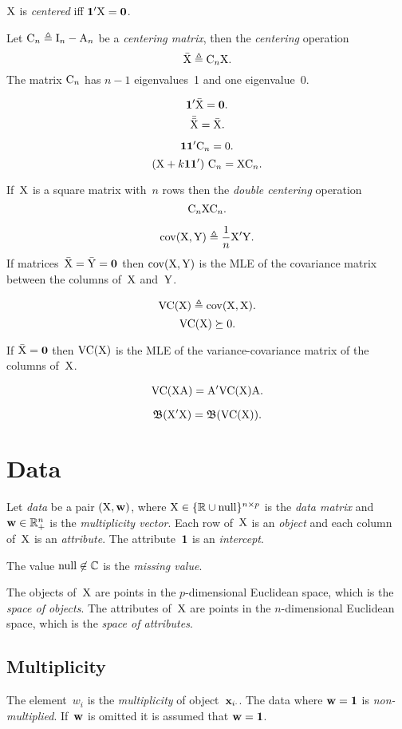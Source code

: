 \documentclass[10pt,a4paper]{article}
\theoremstyle{plain} \newtheorem{Lem}{Lemma}
\begin{document}
$\mathrm X$ is {\em centered} iff $\mathbf 1' \mathrm X = \mathbf 0$.

Let $\mathrm C_n \triangleq \mathrm I_n - \mathrm A_n$ be a {\em centering matrix}, then the {\em centering} operation
$$ \bar {\mathrm X} \triangleq \mathrm C_n \mathrm X. $$
The matrix $\mathrm C_n$ has $n-1$ eigenvalues~1 and one eigenvalue~0.

$$ \mathbf 1' \bar {\mathrm X} = \mathbf 0. $$
$$ \bar {\bar {\mathrm X}} = \bar {\mathrm X}. $$

$$ \mathbf 1 \mathbf 1' \mathrm C_n = \mathrm 0. $$
$$ (\mathrm X + k \mathbf 1 \mathbf 1') \ \mathrm C_n = \mathrm X \mathrm C_n. $$

If~$\mathrm X$ is a square matrix with~$n$ rows then the {\em double centering} operation 
$$ \mathrm C_n \mathrm X \mathrm C_n. $$

$$ \mathrm {cov}(\mathrm X, \mathrm Y) \triangleq \frac 1 n \mathrm X' \mathrm Y. $$
If matrices~$\bar {\mathrm X} = \bar {\mathrm Y} = \mathbf 0$ then $\mathrm {cov}(\mathrm X, \mathrm Y)$
is the MLE of the covariance matrix between the columns of~$\mathrm X$ and~$\mathrm Y$.

$$ \mathrm {VC} (\mathrm X) \triangleq \mathrm {cov}(\mathrm X, \mathrm X). $$
$$ \mathrm {VC}(\mathrm X) \succeq 0. $$

If $\bar {\mathrm X} = \mathbf 0$ then $\mathrm {VC}(\mathrm X)$ is the MLE of the variance-covariance matrix of the columns of~$\mathrm X$.

$$ \mathrm {VC}(\mathrm X \mathrm A) = \mathrm A' \mathrm {VC} (\mathrm X) \mathrm A. $$

$$ \mathfrak B (\mathrm X' \mathrm X) = \mathfrak B (\mathrm {VC} (\mathrm X)). $$


\section{Data}
Let {\em data} be a pair $(\mathrm X, \mathbf w)$,
where $\mathrm X \in \{\mathbb R \cup \mathrm {null}\}^{n \times p}$ is the {\em data matrix} and $\mathbf w \in \mathbb R_+^n$ is the {\em multiplicity vector}.
Each row of~$\mathrm X$ is an {\em object} and each column of~$\mathrm X$ is an {\em attribute}.
The attribute~$\mathbf 1$ is an {\em intercept}.

The value $\mathrm {null} \not \in \mathbb C$ is the {\em missing value}.

The objects of~$\mathrm X$ are points in the $p$-dimensional Euclidean space, which is the {\em space of objects}.
The attributes of~$\mathrm X$ are points in the $n$-dimensional Euclidean space, which is the {\em space of attributes}.

\subsection{Multiplicity}
The element~$w_i$ is the {\em multiplicity} of object~$\mathbf x_{i\cdot}$.
The data where $\mathbf w = \mathbf 1$ is {\em non-multiplied}.
If~$\mathbf w$ is omitted it is assumed that $\mathbf w = \mathbf 1$.
\end{document}
